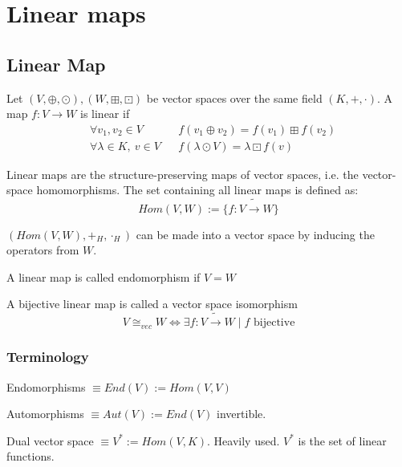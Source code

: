 \documentclass[root.tex]{subfiles}
\begin{document}

\chapter{Linear maps}%
  \section{Linear Map}
  \begin{mydef}
    Let $(V,\oplus,\odot),(W,\boxplus,\boxdot)$ be vector spaces over the same field $(K, +,\cdot)$. A map $f : V \rightarrow W$ is linear if
    \begin{align*}
      & \forall v_1, v_2 \in V && f(v_1 \oplus v_2) = f(v_1) \boxplus f(v_2)\\
      & \forall \lambda \in K,\ v\in V && f(\lambda \odot V) = \lambda \boxdot f(v)
    \end{align*}
  \end{mydef}
  \begin{mydef}
    Linear maps are the structure-preserving maps of vector spaces, i.e. the vector-space homomorphisms. The set containing all linear maps is defined as:
    $$
    Hom(V,W) := \{ f : V \tilde{\longrightarrow} W\}
    $$
  \end{mydef}
  \begin{mydef}
    $(Hom(V,W), +_H, \cdot_H)$ can be made into a vector space by inducing the operators from $W$.
  \end{mydef}
  \begin{mydef}
    A linear map is called endomorphism if $V=W$
  \end{mydef}
  \begin{mydef}
    A bijective linear map is called a vector space isomorphism
    $$
    V \cong_{vec} W \Leftrightarrow \exists f : V \tilde{\longrightarrow} W \mid f \text{ bijective}
    $$
  \end{mydef}
  \subsection*{Terminology}
  \begin{mydef}
    Endomorphisms $\equiv End(V) := Hom(V,V)$
  \end{mydef}
  \begin{mydef}
    Automorphisms $\equiv Aut(V) := End(V)$ invertible.
  \end{mydef}
  \begin{mydef}
    Dual vector space $\equiv V^* := Hom(V,K)$. Heavily used. $V^*$ is the set of linear functions.
  \end{mydef}
\end{document}
